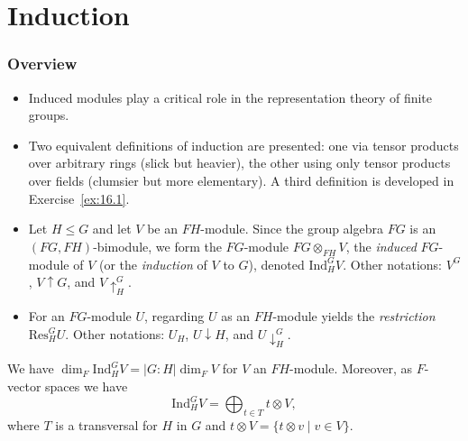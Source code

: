 \documentclass[../Odyssey_Project.tex]{subfiles}
\begin{document}
\setcounter{section}{15}
\section{Induction}

\subsubsection*{Overview}
\begin{itemize}
    \item Induced modules play a critical role in the representation theory of finite groups.
    \item Two equivalent definitions of induction are presented: one via tensor products over arbitrary rings (slick but heavier), the other using only tensor products over fields (clumsier but more elementary). A third definition is developed in Exercise~\ref{ex:16.1}.
    \item Let $H \leq G$ and let $V$ be an $FH$-module. Since the group algebra $FG$ is an $(FG, FH)$-bimodule, we form the $FG$-module $FG \otimes_{FH} V$, the \emph{induced} $FG$-module of $V$ (or the \emph{induction} of $V$ to $G$), denoted $\mathrm{Ind}_H^G V$. Other notations: $V^G$, $V \uparrow G$, and $V \uparrow_H^G$.
    \item For an $FG$-module $U$, regarding $U$ as an $FH$-module yields the \emph{restriction} $\mathrm{Res}_H^G U$. Other notations: $U_H$, $U \downarrow H$, and $U \downarrow_H^G$.
\end{itemize}

\begin{lemma}
\label{lem:16.1}
We have $\dim_F \mathrm{Ind}_H^G V = |G : H| \dim_F V$ for $V$ an $FH$-module. Moreover, as $F$-vector spaces we have
\[
\mathrm{Ind}_H^G V = \bigoplus_{t \in T} t \otimes V,
\]
where $T$ is a transversal for $H$ in $G$ and $t \otimes V = \{t \otimes v \mid v \in V\}$.
\end{lemma}
\end{document}
